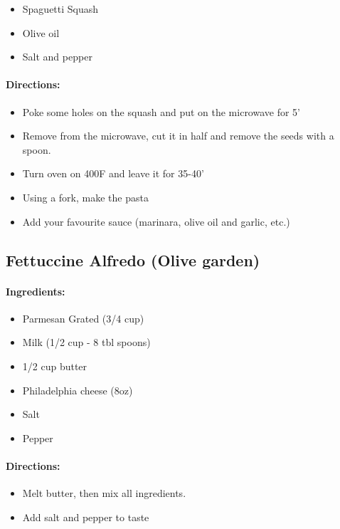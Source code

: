\documentclass{article}
\begin{document}
\begin{itemize}
	\item Spaguetti Squash
	\item Olive oil
	\item Salt and pepper
	
\end{itemize}

\paragraph{Directions:}
\begin{itemize}
	\item Poke some holes on the squash and put on the microwave for 5'
	\item Remove from the microwave, cut it in half and remove the seeds with a spoon.
	\item Turn oven on 400F and leave it for 35-40'
	\item Using a fork, make the pasta
	\item Add your favourite sauce (marinara, olive oil and garlic, etc.)
\end{itemize}

\subsection{Fettuccine Alfredo (Olive garden)}

\paragraph{Ingredients:}

\begin{itemize}
  \item Parmesan Grated (3/4 cup)
  \item Milk (1/2 cup - 8 tbl spoons)
  \item 1/2 cup butter
  \item Philadelphia cheese (8oz)
  \item Salt
  \item Pepper
\end{itemize}

\paragraph{Directions:}
\begin{itemize}
  \item Melt butter, then mix all ingredients.
  \item Add salt and pepper to taste
\end{itemize}
\end{document}
